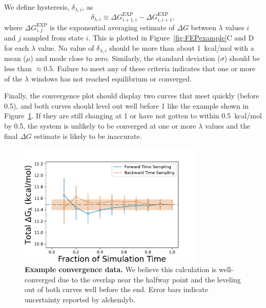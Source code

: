 \documentclass[9pt,tutorial,pubversion]{Styling/livecoms}
\begin{document}
We define hysteresis, $\delta_{\lambda,i}$, as 
\begin{equation}\label{eq:hysteresis}
    \delta_{\lambda, i} \equiv \Delta G^\mathrm{EXP}_{i+1,i}-\Delta G^\mathrm{EXP}_{i,i+1},
\end{equation}
where $\Delta G^\mathrm{EXP}_{i,j}$ is the exponential averaging estimate of $\Delta G$ between $\lambda$ values $i$ and $j$ sampled from state $i$.
This is plotted in Figure~\ref{fig:FEPexample}C and D for each $\lambda$ value.
No value of $\delta_{\lambda,i}$ should be more than about 1~kcal/mol with a mean ($\mu$) and mode close to zero. 
Similarly, the standard deviation ($\sigma$) should be less than $\approx0.5$. 
Failure to meet any of these criteria indicates that one or more of the $\lambda$ windows has not reached equilibrium or converged.

Finally, the convergence plot should display two curves that meet quickly (before 0.5), and both curves should level out well before 1 like the example shown in Figure~\ref{fig:convergenceExample}. 
If they are still changing at 1 or have not gotten to within 0.5~\mbox{kcal/mol} by 0.5, the system is unlikely to be converged at one or more $\lambda$ values and the final $\Delta G$ estimate is likely to be inaccurate.

\begin{figure}[htb]
    \centering
    \includegraphics[width=250pt]{good_convergence}
    \caption{\textbf{Example convergence data.} We believe this calculation is well-converged due to the overlap near the halfway point and the leveling out of both curves well before the end. Error bars indicate uncertainty reported by alchemlyb.
    }\label{fig:convergenceExample}
\end{figure}
\end{document}
